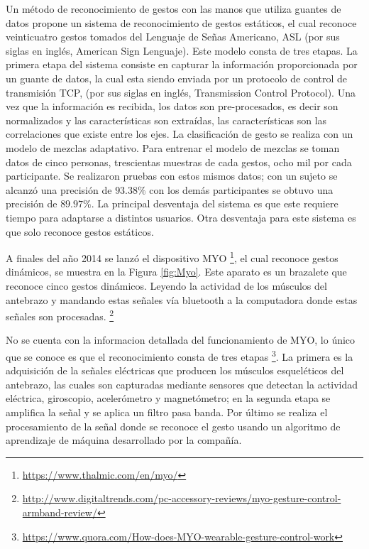Un método de reconocimiento de gestos con las manos que utiliza guantes de datos \citep{Yoon2012} propone un sistema de reconocimiento de gestos estáticos, el cual reconoce veinticuatro gestos tomados del Lenguaje de Señas Americano, ASL (por sus siglas en inglés, American Sign Lenguaje). Este modelo consta de tres etapas. 
La primera etapa del sistema consiste en capturar la información proporcionada por un guante de datos, la cual esta siendo enviada por un protocolo de control de transmisión TCP, (por sus siglas en inglés, Transmission Control Protocol).
Una vez que la información es recibida, los datos son pre-procesados, es decir son normalizados y las características son extraídas, las características son las correlaciones que existe entre los ejes.   
La clasificación de gesto se realiza con un modelo de mezclas adaptativo. Para entrenar el modelo de mezclas se toman datos de cinco personas, trescientas muestras de cada gestos, ocho mil por cada participante. Se realizaron pruebas con estos mismos datos; con un sujeto se alcanzó una precisión de $93.38 \%$ con los demás participantes se obtuvo una precisión de $89.97 \%$.  
La principal desventaja del sistema es que este requiere tiempo para adaptarse a distintos usuarios. Otra desventaja para este sistema es que solo reconoce gestos estáticos. 

A finales del año 2014 se lanzó el dispositivo MYO \footnote{\url{https://www.thalmic.com/en/myo/}}, el cual reconoce gestos dinámicos, se muestra en la Figura \ref{fig:Myo}. Este aparato es un brazalete que reconoce cinco gestos dinámicos. Leyendo la actividad de los músculos del antebrazo y mandando estas señales vía bluetooth a la computadora donde estas señales son procesadas. \footnote{\url{http://www.digitaltrends.com/pc-accessory-reviews/myo-gesture-control-armband-review/}} 

No se cuenta con la informacion detallada del funcionamiento de MYO, lo único que se conoce es que el reconocimiento consta de tres etapas \footnote{\url{https://www.quora.com/How-does-MYO-wearable-gesture-control-work}}. La primera es la adquisición de la señales eléctricas que producen los músculos esqueléticos del antebrazo, las cuales son capturadas mediante sensores que detectan la actividad eléctrica, giroscopio, acelerómetro y magnetómetro; en la segunda etapa se amplifica la señal y se aplica un filtro pasa banda. Por último se realiza el procesamiento de la señal donde se reconoce el gesto usando un algoritmo de aprendizaje de máquina desarrollado por la compañía.  

